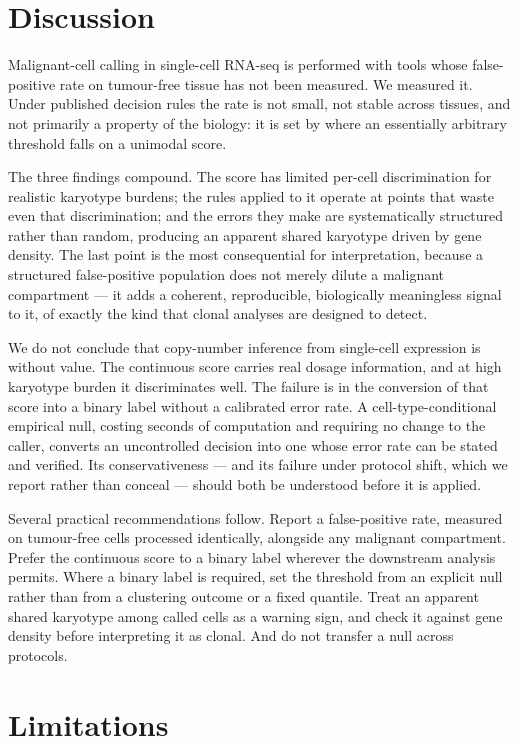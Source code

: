\documentclass[11pt]{article}
\begin{document}
\section{Discussion}

Malignant-cell calling in single-cell RNA-seq is performed with tools whose
false-positive rate on tumour-free tissue has not been measured. We measured
it. Under published decision rules the rate is not small, not stable across
tissues, and not primarily a property of the biology: it is set by where an
essentially arbitrary threshold falls on a unimodal score.

The three findings compound. The score has limited per-cell discrimination
for realistic karyotype burdens; the rules applied to it operate at points
that waste even that discrimination; and the errors they make are
systematically structured rather than random, producing an apparent shared
karyotype driven by gene density. The last point is the most consequential
for interpretation, because a structured false-positive population does not
merely dilute a malignant compartment --- it adds a coherent, reproducible,
biologically meaningless signal to it, of exactly the kind that clonal
analyses are designed to detect.

We do not conclude that copy-number inference from single-cell expression is
without value. The continuous score carries real dosage information, and at
high karyotype burden it discriminates well. The failure is in the conversion
of that score into a binary label without a calibrated error rate. A
cell-type-conditional empirical null, costing seconds of computation and
requiring no change to the caller, converts an uncontrolled decision into one
whose error rate can be stated and verified. Its conservativeness --- and its
failure under protocol shift, which we report rather than conceal --- should
both be understood before it is applied.

Several practical recommendations follow. Report a false-positive rate,
measured on tumour-free cells processed identically, alongside any malignant
compartment. Prefer the continuous score to a binary label wherever the
downstream analysis permits. Where a binary label is required, set the
threshold from an explicit null rather than from a clustering outcome or a
fixed quantile. Treat an apparent shared karyotype among called cells as a
warning sign, and check it against gene density before interpreting it as
clonal. And do not transfer a null across protocols.

\section{Limitations}
\end{document}
